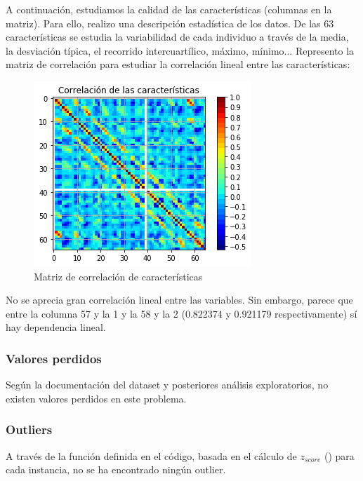 A continuación, estudiamos la calidad de las características (columnas en la matriz). Para ello, realizo una descripción estadística de los datos. De las 63 características se estudia la variabilidad de cada individuo a través de la media, la desviación típica, el recorrido intercuartílico, máximo, mínimo... Represento la matriz de correlación para estudiar la correlación lineal entre las características:

\begin{figure}[H] %
	\centering
	\includegraphics[scale=0.8]{corr-matrix.png}  %
	\caption{Matriz de correlación de características} 
	\label{fig:corr-mat}
\end{figure}

No se aprecia gran correlación lineal entre las variables. Sin embargo, parece que entre la columna 57 y la 1 y la 58 y la 2 (0.822374 y 0.921179 respectivamente) sí hay dependencia lineal.

\subsubsection{Valores perdidos}

Según la documentación del dataset y posteriores análisis exploratorios, no existen valores perdidos en este problema.

\subsubsection{Outliers}

A través de la función definida en el código, basada en el cálculo de $z_{score}$ (\cite{z-score})  para cada instancia, no se ha encontrado ningún outlier. 

